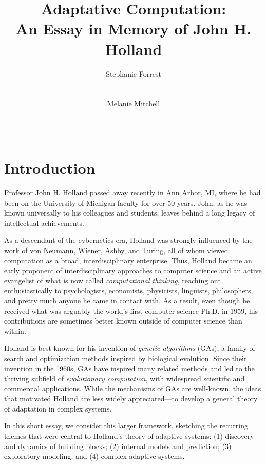 \documentclass{sig-alternate}
\title{Adaptative Computation:\\ An Essay in Memory of John H. Holland}
\author 
{\alignauthor
 Stephanie Forrest\\
 \affaddr{University of New Mexico}\\
 \affaddr{Santa Fe Institute}\\
 \email{forrest@cs.unm.edu}
 \alignauthor
Melanie Mitchell \\
 \affaddr{Portland State University}\\
 \affaddr{Santa Fe Institute}\\
 \email{mm@pdx.edu}
}
\begin{document}
\maketitle

% 

\section{Introduction}

Professor John H. Holland passed away recently in Ann Arbor, MI, where
he had been on the University of Michigan faculty for over 50 years.  John, as he was known
universally to his colleagues and students, leaves behind a long
legacy of intellectual achievements.

As a descendant of the cybernetics era, Holland was strongly influenced
by the work of von Neumann, Wiener, Ashby, and Turing, all of whom
viewed computation as a broad, interdisciplinary enterprise.  Thus,
Holland became an early proponent of interdisciplinary approaches to
computer science and an active evangelist of what is now called
\emph{computational thinking}, reaching out enthusiastically to
psychologists, economists, physicists, linguists, philosophers, and
pretty much anyone he came in contact with.  As a result, even though
he received what was arguably the world's first computer science
Ph.D. in 1959, his contributions are sometimes better known outside of
computer science than within.

Holland is best known for his invention of \emph{genetic
  algorithms} (GAs), a family of search and optimization methods inspired
by biological evolution.  Since their invention in the 1960s, GAs have
inspired many related methods and led to the thriving subfield of
\emph{evolutionary computation}, with widespread scientific and
commercial applications.  While the mechanisms of GAs are well-known,
the ideas that motivated Holland are less widely appreciated---to develop a general
theory of adaptation in complex systems.  

In this short essay, we consider this larger framework, sketching the
recurring themes that were central to Holland's theory of
adaptive systems: (1) discovery and 
dynamics of building blocks; (2) internal models and prediction; (3) 
exploratory modeling; and (4) complex adaptive systems.  
\end{document}
